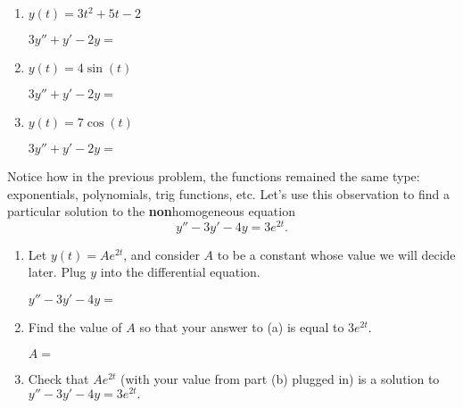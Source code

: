\documentclass[12pt]{article}
\begin{document}
\begin{enumerate}
\begin{enumerate}
		\item $y(t)=3t^2+5t-2$
			\begin{flushright} $3y''+y'-2y=$  \end{flushright}
		\vfill
		
		\item $y(t)=4\sin(t)$
			\begin{flushright} $3y''+y'-2y=$  \end{flushright}
		\vfill
		
		\item $y(t)=7\cos(t)$		
			\begin{flushright} $3y''+y'-2y=$  \end{flushright}
		\vfill
		
		\end{enumerate}	
		
	\pagebreak	
	\Problem Notice how in the previous problem, the functions remained the same type: exponentials, polynomials, trig functions, etc. Let's use this observation to find a particular solution to the \textbf{non}homogeneous equation
	$$y''-3y'-4y=3e^{2t}.$$
		\begin{enumerate}
		\item Let $y(t)=Ae^{2t}$, and consider $A$ to be a constant whose value we will decide later. Plug $y$ into the differential equation. 
			\vspace*{-12pt}
			\begin{flushright} $y''-3y'-4y=$  \end{flushright}
		\vfill
		
		\item Find the value of $A$ so that your answer to (a) is equal to $3e^{2t}$. 
			\begin{flushright} $A=$  \end{flushright}
		\vfill
		
		\item Check that $Ae^{2t}$ (with your value from part (b) plugged in) is a solution to $y''-3y'-4y=3e^{2t}.$
		\vfill
		\end{enumerate}
	\vfill
	
  

\end{enumerate}
\end{document}
